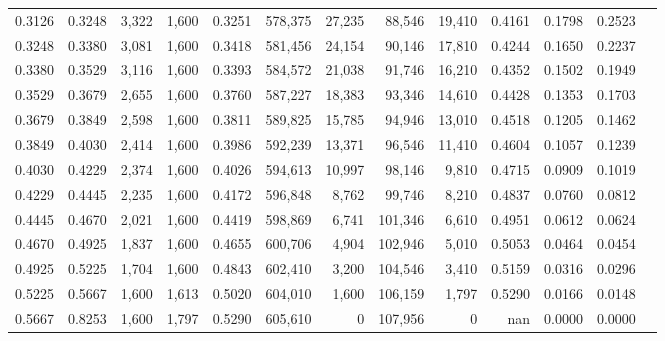\begin{tabular}{rrrrrrrrrrrrr}
0.3126 & 0.3248 &  3,322 & 1,600 &                                     0.3251 & 578,375 &  27,235 &  88,546 &  19,410 & 0.4161 & 0.1798 & 0.2523 \\
0.3248 & 0.3380 &  3,081 & 1,600 &                                     0.3418 & 581,456 &  24,154 &  90,146 &  17,810 & 0.4244 & 0.1650 & 0.2237 \\
0.3380 & 0.3529 &  3,116 & 1,600 &                                     0.3393 & 584,572 &  21,038 &  91,746 &  16,210 & 0.4352 & 0.1502 & 0.1949 \\
0.3529 & 0.3679 &  2,655 & 1,600 &                                     0.3760 & 587,227 &  18,383 &  93,346 &  14,610 & 0.4428 & 0.1353 & 0.1703 \\
0.3679 & 0.3849 &  2,598 & 1,600 &                                     0.3811 & 589,825 &  15,785 &  94,946 &  13,010 & 0.4518 & 0.1205 & 0.1462 \\
0.3849 & 0.4030 &  2,414 & 1,600 &                                     0.3986 & 592,239 &  13,371 &  96,546 &  11,410 & 0.4604 & 0.1057 & 0.1239 \\
0.4030 & 0.4229 &  2,374 & 1,600 &                                     0.4026 & 594,613 &  10,997 &  98,146 &   9,810 & 0.4715 & 0.0909 & 0.1019 \\
0.4229 & 0.4445 &  2,235 & 1,600 &                                     0.4172 & 596,848 &   8,762 &  99,746 &   8,210 & 0.4837 & 0.0760 & 0.0812 \\
0.4445 & 0.4670 &  2,021 & 1,600 &                                     0.4419 & 598,869 &   6,741 & 101,346 &   6,610 & 0.4951 & 0.0612 & 0.0624 \\
0.4670 & 0.4925 &  1,837 & 1,600 &                                     0.4655 & 600,706 &   4,904 & 102,946 &   5,010 & 0.5053 & 0.0464 & 0.0454 \\
0.4925 & 0.5225 &  1,704 & 1,600 &                                     0.4843 & 602,410 &   3,200 & 104,546 &   3,410 & 0.5159 & 0.0316 & 0.0296 \\
0.5225 & 0.5667 &  1,600 & 1,613 &                                     0.5020 & 604,010 &   1,600 & 106,159 &   1,797 & 0.5290 & 0.0166 & 0.0148 \\
0.5667 & 0.8253 &  1,600 & 1,797 &                                     0.5290 & 605,610 &       0 & 107,956 &       0 &    nan & 0.0000 & 0.0000 \\
\bottomrule
\end{tabular}
